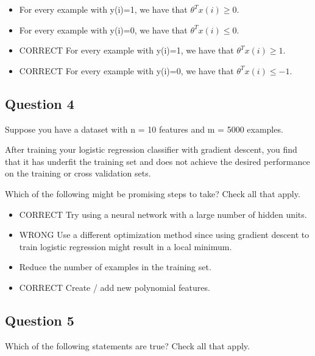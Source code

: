 \documentclass[11pt]{article} %
\begin{document}
\begin{itemize}
\item For every example with y(i)=1, we have that $ \theta^T x(i)\geq 0$.

\item For every example with y(i)=0, we have that $ \theta^T x(i)\leq 0$.

\item CORRECT For every example with y(i)=1, we have that $ \theta^T x(i)\geq 1$.

\item CORRECT For every example with y(i)=0, we have that $ \theta^T x(i)\leq -1$.
\end{itemize}

\subsection*{Question 4}
Suppose you have a dataset with n = 10 features and m = 5000 examples.

After training your logistic regression classifier with gradient descent, you find that it has underfit the training set and does not achieve the desired performance on the training or cross validation sets.

Which of the following might be promising steps to take? Check all that apply.
\begin{itemize}
	\item CORRECT Try using a neural network with a large number of hidden units.
	
	\item WRONG Use a different optimization method since using gradient descent to train logistic regression might result in a local minimum.
	
	\item Reduce the number of examples in the training set.
	
	\item CORRECT Create / add new polynomial features.
\end{itemize}


\subsection*{Question 5} 
Which of the following statements are true? Check all that apply.
\end{document}
